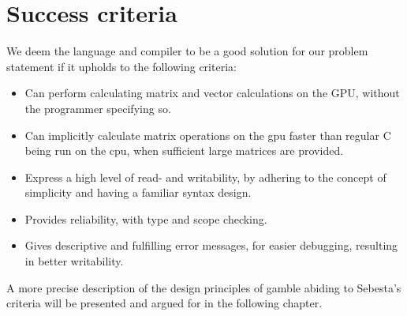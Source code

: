\section{Success criteria}\label{sec:OurCriterias}
We deem the language and compiler to be a good solution for our problem statement if it upholds to the following criteria:

\begin{itemize}
	\item Can perform calculating matrix and vector calculations on the GPU, without the programmer specifying so.
	\item Can implicitly calculate matrix operations on the \acrshort{gpu} faster than regular C being run on the \acrshort{cpu}, when sufficient large matrices are provided.
	\item Express a high level of read- and writability, by adhering to the concept of simplicity and having a familiar syntax design.
	\item Provides reliability, with type and scope checking.
	\item Gives descriptive and fulfilling error messages, for easier debugging, resulting in better writability.
\end{itemize}

A more precise description of the design principles of \gls{gamble} abiding to Sebesta's criteria will be presented and argued for in the following chapter.

